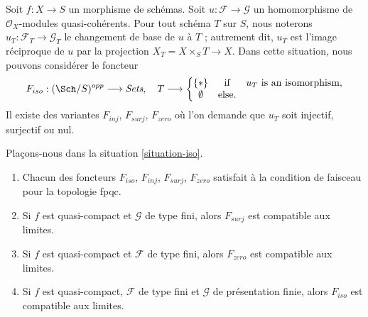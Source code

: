 \begin{situation}
\label{situation-iso}
Soit $f : X \to S$ un morphisme de schémas.
Soit $u : \mathcal{F} \to \mathcal{G}$ un homomorphisme de
$\mathcal{O}_X$-modules quasi-cohérents. Pour tout schéma $T$ sur
$S$, nous noterons $u_T : \mathcal{F}_T \to \mathcal{G}_T$ le
changement de base de $u$ à $T$ ; autrement dit, $u_T$ est l'image réciproque
de $u$ par la projection $X_T = X \times_S T \to X$.
Dans cette situation, nous pouvons considérer le foncteur
\begin{equation}
\label{equation-iso}
F_{iso} : (\Sch/S)^{opp} \longrightarrow \textit{Sets}, \quad
T \longrightarrow \left\{
\begin{matrix}
\{*\} & \text{if} & u_T \text{ is an isomorphism}, \\
\emptyset & \text{else.} &
\end{matrix}
\right.
\end{equation}
Il existe des variantes $F_{inj}$, $F_{surj}$, $F_{zero}$ où l'on demande que
$u_T$ soit injectif, surjectif ou nul.
\end{situation}

\begin{lemma}
\label{lemma-iso-sheaf}
Plaçons-nous dans la situation \ref{situation-iso}.
\begin{enumerate}
\item Chacun des foncteurs $F_{iso}$, $F_{inj}$, $F_{surj}$, $F_{zero}$
satisfait à la condition de faisceau pour la topologie fpqc.
\item Si $f$ est quasi-compact et $\mathcal{G}$ de type fini,
alors $F_{surj}$ est compatible aux limites.
\item Si $f$ est quasi-compact et $\mathcal{F}$ de type fini, alors
$F_{zero}$ est compatible aux limites.
\item Si $f$ est quasi-compact, $\mathcal{F}$ de type fini et
$\mathcal{G}$ de présentation finie, alors $F_{iso}$ est compatible aux limites.
\end{enumerate}
\end{lemma}

